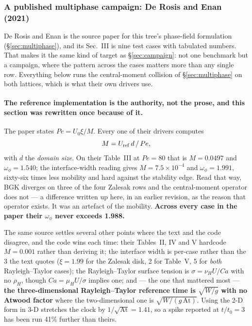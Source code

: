 \documentclass[11pt,a4paper]{article}
\newcommand{\e}[1]{\times 10^{#1}}
\begin{document}
\subsubsection{A published multiphase campaign: De Rosis and Enan (2021)}
\label{sec:enan}

De Rosis and Enan \cite{derosis2021} is the source paper for this tree's
phase-field formulation (\S\ref{sec:multiphase}), and its Sec.~III is nine test
cases with tabulated numbers. That makes it the same kind of target as
\S\ref{sec:campaign}: not one benchmark but a campaign, where the pattern
across the cases matters more than any single row. Everything below runs the
central-moment collision of \S\ref{sec:multiphase} on both lattices, which is
what their own drivers use.

\paragraph{The reference implementation is the authority, not the prose, and
this section was rewritten once because of it.} The paper states
$Pe = U_0\xi/M$. Every one of their drivers computes
\[
  M = U_{\rm ref}\,d\,/\,Pe,
\]
with $d$ the \emph{domain size}. On their Table~III at $Pe=80$ that is
$M=0.0497$ and $\omega_\phi=1.540$; the interface-width reading gives
$M=7.5\e{-4}$ and $\omega_\phi=1.991$, sixty-six times less mobility and hard
against the stability edge. Read that way, BGK diverges on three of the four
Zalesak rows and the central-moment operator does not --- a difference written
up here, in an earlier revision, as the reason that operator exists. It was an
artefact of the mobility. \textbf{Across every case in the paper their
$\omega_\phi$ never exceeds 1.988.}

The same source settles several other points where the text and the code
disagree, and the code wins each time: their Tables~II, IV and V hardcode
$M=0.001$ rather than deriving it; the interface width is per-case rather than
the 3 the text quotes ($\xi=1.99$ for the Zalesak disk, 2 for Table~V, 5 for
\emph{both} Rayleigh--Taylor cases); the Rayleigh--Taylor surface tension is
$\sigma=\nu_H U/Ca$ with no $\rho_H$, though $Ca=\mu_H U/\sigma$ implies one;
and --- the one that mattered most --- \textbf{the three-dimensional
Rayleigh--Taylor reference time is $\sqrt{W/g}$ with no Atwood factor} where
the two-dimensional one is $\sqrt{W/(g\,\mathrm{At})}$. Using the 2-D form in
3-D stretches the clock by $1/\sqrt{\mathrm{At}}=1.41$, so a spike reported at
$t/t_0=3$ has been run 41\% further than theirs.
\end{document}
